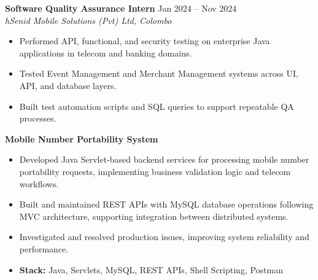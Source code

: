 \documentclass[12pt,a4paper]{article}
\begin{document}
\vspace{6pt}

\noindent\textbf{Software Quality Assurance Intern} \hfill Jan 2024 -- Nov 2024\\
\textit{hSenid Mobile Solutions (Pvt) Ltd, Colombo}

\begin{itemize}[leftmargin=*, itemsep=2pt, topsep=3pt]
    \item Performed API, functional, and security testing on enterprise Java applications in telecom and banking domains.
    \item Tested Event Management and Merchant Management systems across UI, API, and database layers.
    \item Built test automation scripts and SQL queries to support repeatable QA processes.
\end{itemize}

\newpage

\noindent\textbf{Mobile Number Portability System}
\begin{itemize}[leftmargin=*, itemsep=2pt, topsep=2pt]

\item Developed Java Servlet-based backend services for processing mobile number portability requests, implementing business validation logic and telecom workflows.

\item Built and maintained REST APIs with MySQL database operations following MVC architecture, supporting integration between distributed systems.

\item Investigated and resolved production issues, improving system reliability and performance.

\item \textbf{Stack:} Java, Servlets, MySQL, REST APIs, Shell Scripting, Postman

\end{itemize}
\end{document}
